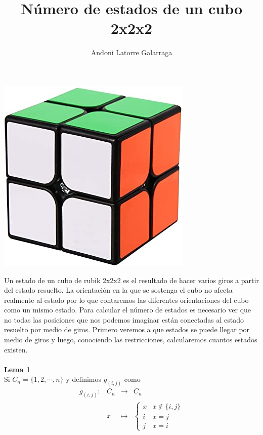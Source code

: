 \documentclass{article}
\title{Número de estados de un cubo 2x2x2}
\author{Andoni Latorre Galarraga}
\date{}
\begin{document}
\maketitle

\begin{center}
    \includegraphics[scale=0.75]{figuras/61D7znf3r-L._AC_SY355_.jpg}
\end{center}
\pagebreak
\noindent Un estado de un cubo de rubik 2x2x2 es el resultado de hacer varios giros a partir del estado resuelto. La orientación en la que se sostenga el cubo no afecta realmente al estado por lo que contaremos las diferentes orientaciones del cubo como un mismo estado. Para calcular el número de estados es necesario ver que no todas las posiciones que nos podemos imaginar están conectadas al estado resuelto por medio de giros. Primero veremos a que estados se puede llegar por medio de giros y luego, conociendo las restricciones, calcularemos cuantos estados existen.\\\\
\noindent\textbf{Lema 1}\\
Si $C_n=\{1,2,\cdots,n\}$ y definimos $g_{(i,j)}$ como
$$
\begin{array}{cccc}
    g_{(i,j)}: & C_n & \longrightarrow & C_n\\
               & x   & \longmapsto     & \left\{ \begin{array}{cc}
                                                 x &  x\notin \{i,j\}\\
                                                 i &  x=j\\
                                                 j &  x=i
                                                 \end{array}\right.
\end{array}
$$
\end{document}
